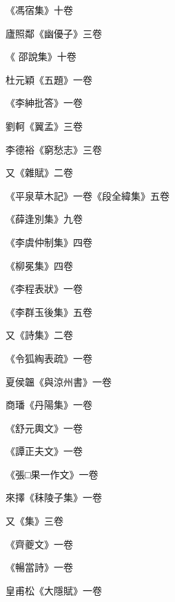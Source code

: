 \begin{pinyinscope}
 《馮宿集》十卷



 廬照鄰《幽優子》三卷



 《
 邵說集》十卷



 杜元穎《五題》一卷



 《李紳批答》一卷



 劉軻《翼孟》三卷



 李德裕《窮愁志》三卷



 又《雜賦》二卷



 《平泉草木記》一卷《段全緯集》五卷



 《薛逢別集》九卷



 《李虞仲制集》四卷



 《柳冕集》四卷



 《李程表狀》一卷



 《李群玉後集》五卷



 又《詩集》二卷



 《令狐綯表疏》一卷



 夏侯韞《與涼州書》一卷



 商璠《丹陽集》一卷



 《舒元輿文》一卷



 《譚正夫文》一卷



 《張□果一作文》一卷



 來擇《秣陵子集》一卷



 又《集》三卷



 《齊夔文》一卷



 《暢當詩》一卷



 皇甫松《大隱賦》一卷




\end{pinyinscope}
